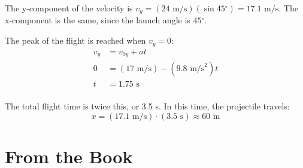 \documentclass{exam}
\newcommand{\degree}{\ensuremath{^\circ}}
\begin{document}
\begin{questions}
\begin{parts}
\begin{solution}
The y-component of the velocity is $v_y =  (24 \text{ m/s})(\sin 45 \degree) = 17.1 \text{ m/s}$.  The x-component is the same,
since the launch angle is $45 \degree$.

The peak of the flight is reached when $v_y = 0$:
\begin{align*}
  v_y &= v_{0y} + at \\
  0 &= (17 \text{ m/s}) - (9.8 \text{ m/s}^2)t \\
  t &= 1.75 \text{ s} \\
\end{align*}

The total flight time is twice this, or 3.5 s.  In this time, the projectile travels:
\[
  x = (17.1 \text{ m/s}) \cdot (3.5 \text{ s}) \approx 60 \text{ m} 
\]

\end{solution}

\end{parts} 

\end{questions}

\ifprintanswers

\section{From the Book}
\end{document}
